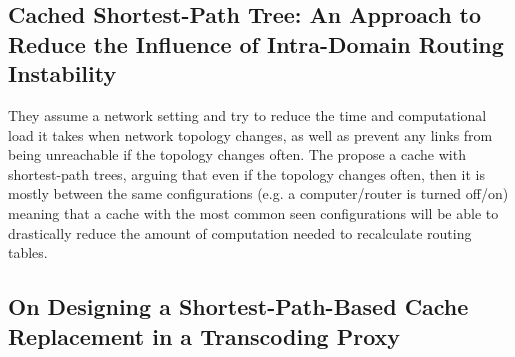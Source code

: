 \cite{codsa}


\subsection{Cached Shortest-Path Tree: An Approach to Reduce the Influence of Intra-Domain Routing Instability}

They assume a network setting and try to reduce the time and computational load it takes when network topology changes, as well as prevent any links from being unreachable if the topology changes often. The propose a cache with shortest-path trees, arguing that even if the topology changes often, then it is mostly between the same configurations (e.g. a computer/router is turned off/on) meaning that a cache with the most common seen configurations will be able to drastically reduce the amount of computation needed to recalculate routing tables.

\cite{csptri}



\subsection{On Designing a Shortest-Path-Based Cache Replacement in a Transcoding Proxy}


\cite{spcrtp}


